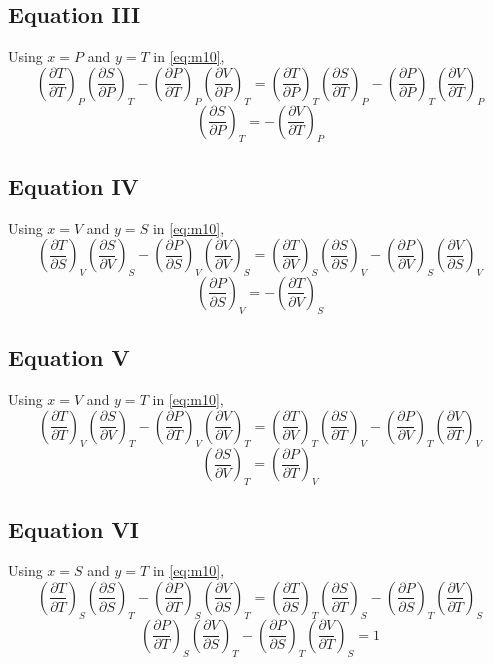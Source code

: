 \documentclass{article}
\numberwithin{equation}{section}
\begin{document}
\subsection{Equation III}
Using $x=P$ and $y=T$ in \eqref{eq:m10},
$$\left(\frac{\partial T}{\partial T}\right)_P \left(\frac{\partial S}{\partial P}\right)_T - \left(\frac{\partial P}{\partial T}\right)_P \left(\frac{\partial V}{\partial P}\right)_T = \left(\frac{\partial T}{\partial P}\right)_T \left(\frac{\partial S}{\partial T}\right)_P - \left(\frac{\partial P}{\partial P}\right)_T \left(\frac{\partial V}{\partial T}\right)_P$$
$$\boxed{\left(\frac{\partial S}{\partial P}\right)_T = - \left(\frac{\partial V}{\partial T}\right)_P}$$

\subsection{Equation IV}
Using $x=V$ and $y=S$ in \eqref{eq:m10},
$$\left(\frac{\partial T}{\partial S}\right)_V \left(\frac{\partial S}{\partial V}\right)_S - \left(\frac{\partial P}{\partial S}\right)_V \left(\frac{\partial V}{\partial V}\right)_S = \left(\frac{\partial T}{\partial V}\right)_S \left(\frac{\partial S}{\partial S}\right)_V - \left(\frac{\partial P}{\partial V}\right)_S \left(\frac{\partial V}{\partial S}\right)_V$$
$$\boxed{\left(\frac{\partial P}{\partial S}\right)_V = - \left(\frac{\partial T}{\partial V}\right)_S}$$

\subsection{Equation V}
Using $x=V$ and $y=T$ in \eqref{eq:m10},
$$\left(\frac{\partial T}{\partial T}\right)_V \left(\frac{\partial S}{\partial V}\right)_T - \left(\frac{\partial P}{\partial T}\right)_V \left(\frac{\partial V}{\partial V}\right)_T = \left(\frac{\partial T}{\partial V}\right)_T \left(\frac{\partial S}{\partial T}\right)_V - \left(\frac{\partial P}{\partial V}\right)_T \left(\frac{\partial V}{\partial T}\right)_V$$
$$\boxed{\left(\frac{\partial S}{\partial V}\right)_T = \left(\frac{\partial P}{\partial T}\right)_V}$$

\subsection{Equation VI}
Using $x=S$ and $y=T$ in \eqref{eq:m10},
$$\left(\frac{\partial T}{\partial T}\right)_S \left(\frac{\partial S}{\partial S}\right)_T - \left(\frac{\partial P}{\partial T}\right)_S \left(\frac{\partial V}{\partial S}\right)_T = \left(\frac{\partial T}{\partial S}\right)_T \left(\frac{\partial S}{\partial T}\right)_S - \left(\frac{\partial P}{\partial S}\right)_T \left(\frac{\partial V}{\partial T}\right)_S$$
$$\boxed{\left(\frac{\partial P}{\partial T}\right)_S \left(\frac{\partial V}{\partial S}\right)_T - \left(\frac{\partial P}{\partial S}\right)_T \left(\frac{\partial V}{\partial T}\right)_S = 1}$$
\end{document}

